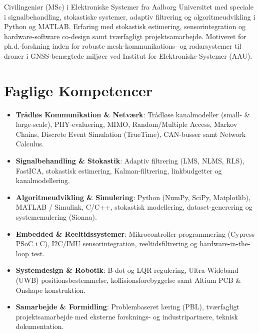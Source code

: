 \documentclass[11pt,a4paper,sans]{moderncv}
\begin{document}
\makecvtitle


\vspace{6pt}
\small{Civilingeniør (MSc) i Elektroniske Systemer fra Aalborg Universitet med speciale i signalbehandling, stokastiske systemer, adaptiv filtrering og algoritmeudvikling i Python og MATLAB. Erfaring med stokastisk estimering, sensorintegration og hardware-software co-design samt tværfagligt projektsamarbejde. Motiveret for ph.d.-forskning inden for robuste mesh-kommunikations- og radarsystemer til droner i GNSS-benægtede miljøer ved Institut for Elektroniske Systemer (AAU).}


\section{Faglige Kompetencer}
\vspace{1pt}
\begin{itemize}

\item \textbf{Trådløs Kommunikation \& Netværk}: Trådløse kanalmodeller (small- \& large-scale), PHY-evaluering, MIMO, Random/Multiple Access, Markov Chains, Discrete Event Simulation (TrueTime), CAN-busser samt Network Calculus.

\item \textbf{Signalbehandling \& Stokastik}: Adaptiv filtrering (LMS, NLMS, RLS), FastICA, stokastisk estimering, Kalman-filtrering, linkbudgetter og kanalmodellering.

\item \textbf{Algoritmeudvikling \& Simulering}: Python (NumPy, SciPy, Matplotlib), MATLAB / Simulink, C/C++, stokastisk modellering, dataset-generering og systememulering (Sionna).

\item \textbf{Embedded \& Reeltidssystemer}: Mikrocontroller-programmering (Cypress PSoC i C), I2C/IMU sensorintegration, reeltidsfiltrering og hardware-in-the-loop test.

\item \textbf{Systemdesign \& Robotik}: B-dot og LQR regulering, Ultra-Wideband (UWB) positionsbestemmelse, kollisionsforebyggelse samt Altium PCB \& Onshape konstruktion.

\item \textbf{Samarbejde \& Formidling}: Problembaseret læring (PBL), tværfagligt projektsamarbejde med eksterne forsknings- og industripartnere, teknisk dokumentation.

\end{itemize}
\end{document}
